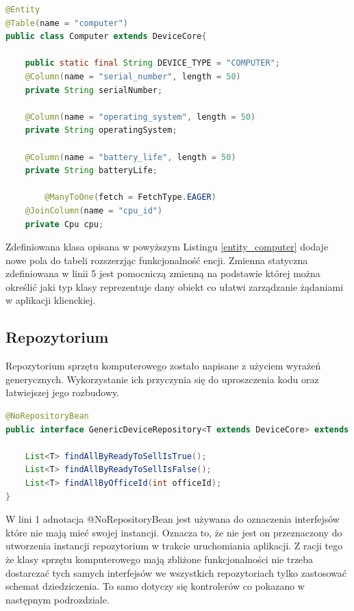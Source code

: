 \begin{lstlisting}[language=Java, style=JavaStyle,  caption={Fragment klasy potomnej Computer}, label={entity_computer}]
@Entity
@Table(name = "computer")
public class Computer extends DeviceCore{

    public static final String DEVICE_TYPE = "COMPUTER";
    @Column(name = "serial_number", length = 50)
    private String serialNumber;

    @Column(name = "operating_system", length = 50)
    private String operatingSystem;

    @Column(name = "battery_life", length = 50)
    private String batteryLife;
		
		@ManyToOne(fetch = FetchType.EAGER)
    @JoinColumn(name = "cpu_id")
    private Cpu cpu;

\end{lstlisting}

Zdefiniowana klasa opisana w powyższym Listingu \ref{entity_computer} dodaje nowe pola do tabeli rozszerzjąc funkcjonalność encji. Zmienna statyczna zdefiniowana w linii 5 jest pomocniczą zmienną na podstawie której można określić jaki typ klasy reprezentuje dany obiekt co ułatwi zarządzanie żądaniami w aplikacji klienckiej.

\subsection{Repozytorium}
Repozytorium sprzętu komputerowego zostało napisane z użyciem wyrażeń generycznych. Wykorzystanie ich przyczynia się do uproszczenia kodu oraz łatwiejszej jego rozbudowy.

\begin{lstlisting}[language=Java, style=JavaStyle,  caption={Generyczne repozytorium sprzętu komputerowego}, label={repo_genericDevice}]
@NoRepositoryBean
public interface GenericDeviceRepository<T extends DeviceCore> extends JpaRepository<T, Integer> {

    List<T> findAllByReadyToSellIsTrue();
    List<T> findAllByReadyToSellIsFalse();
    List<T> findAllByOfficeId(int officeId);
}
\end{lstlisting}

W lini 1 adnotacja @NoRepositoryBean jest używana do oznaczenia interfejsów które nie mają mieć swojej instancji. Oznacza to, że nie jest on przeznaczony do utworzenia instancji repozytorium w trakcie uruchomiania aplikacji. Z racji tego że klasy sprzętu komputerowego mają zbliżone funkcjonalności nie trzeba dostarczać tych samych interfejsów we wszystkich repozytoriach tylko zastosować schemat dziedziczenia. To samo dotyczy się kontrolerów co pokazano w następnym podrozdziale.

